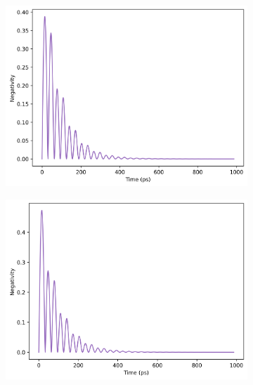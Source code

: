 \documentclass[12pt]{article}
\begin{document}
\begin{figure}[H] 
    \centering
    \begin{subfigure}{0.45\textwidth}
        \centering
        \includegraphics[width=\linewidth]{Research Project/Code/results/JCM/OQS_Neg_Spont.png}
        \caption{}
        \label{fig:JCM_OQS_Neg_Spont}
    \end{subfigure}
    \hfill
    \begin{subfigure}{0.45\textwidth}
        \centering
        \includegraphics[width=\linewidth]{Research Project/Code/results/JCM/OQS_Neg_Therm.png}
        \caption{}
        \label{fig:JCM_OQS_Neg_Therm}
    \end{subfigure}
    

\end{figure}
\end{document}
